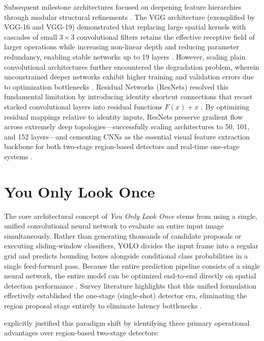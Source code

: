Subsequent milestone architectures focused on deepening feature hierarchies through modular structural refinements \parencite{simonyan_very_2014, he_deep_2015}. The VGG architecture (exemplified by VGG-16 and VGG-19) demonstrated that replacing large spatial kernels with cascades of small $3 \times 3$ convolutional filters retains the effective receptive field of larger operations while increasing non-linear depth and reducing parameter redundancy, enabling stable networks up to 19 layers \parencite{simonyan_very_2014}. However, scaling plain convolutional architectures further encountered the degradation problem, wherein unconstrained deeper networks exhibit higher training and validation errors due to optimization bottlenecks \parencite{he_deep_2015}. Residual Networks (ResNets) resolved this fundamental limitation by introducing identity shortcut connections that recast stacked convolutional layers into residual functions $F(x) + x$ \parencite{he_deep_2015}. By optimizing residual mappings relative to identity inputs, ResNets preserve gradient flow across extremely deep topologies---successfully scaling architectures to 50, 101, and 152 layers---and cementing CNNs as the essential visual feature extraction backbone for both two-stage region-based detectors and real-time one-stage systems \parencite{he_deep_2015, simonyan_very_2014}.

\section{You Only Look Once}
\label{sec:yolo}

The core architectural concept of \emph{You Only Look Once} stems from using a single, unified convolutional neural network to evaluate an entire input image simultaneously. Rather than generating thousands of candidate proposals or executing sliding-window classifiers, YOLO divides the input frame into a regular grid and predicts bounding boxes alongside conditional class probabilities in a single feed-forward pass. Because the entire prediction pipeline consists of a single neural network, the entire model can be optimized end-to-end directly on spatial detection performance \parencite{redmon_you_2016}. Survey literature highlights that this unified formulation effectively established the one-stage (single-shot) detector era, eliminating the region proposal stage entirely to eliminate latency bottlenecks \parencite{ramos_yoloreview}.

\textcite{redmon_you_2016} explicitly justified this paradigm shift by identifying three primary operational advantages over region-based two-stage detectors:

